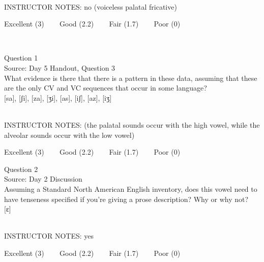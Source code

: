 \documentclass[12pt]{article}
\begin{document}
~\\
INSTRUCTOR NOTES: no (voiceless palatal fricative)


\vfill
Excellent (3) ~~~ Good (2.2) ~~~ Fair (1.7) ~~~ Poor (0)
\newpage

\begin{center}
\textbf{{\color{red}{\HUGE END OF EXAM}}}\\

\end{center}
\newpage

\begin{center}
\textbf{{\color{blue}{\HUGE START OF EXAM\\}}}

\textbf{{\color{blue}{\HUGE Student ID: 6801\\}}}

\textbf{{\color{blue}{\HUGE 2:30 - 2:45 PM\\}}}

\end{center}
\newpage

{\large Question 1}\\

Source: Day 5 Handout, Question 3\\

What evidence is there that there is a pattern in these data, assuming that these are the only CV and VC sequences that occur in some language?\\

{[sa]}, {[ʃi]}, {[za]}, {[ʒi]}, {[as]}, {[iʃ]}, {[az]}, {[iʒ]}


~\\
INSTRUCTOR NOTES: (the palatal sounds occur with the high vowel, while the alveolar sounds occur with the low vowel)


\vfill
Excellent (3) ~~~ Good (2.2) ~~~ Fair (1.7) ~~~ Poor (0)
\newpage

{\large Question 2}\\

Source: Day 2 Discussion\\

Assuming a Standard North American English inventory, does this vowel need to have tenseness specified if you're giving a prose description? Why or why not?\\

{[ɛ]}


~\\
INSTRUCTOR NOTES: yes


\vfill
Excellent (3) ~~~ Good (2.2) ~~~ Fair (1.7) ~~~ Poor (0)
\newpage
\end{document}
